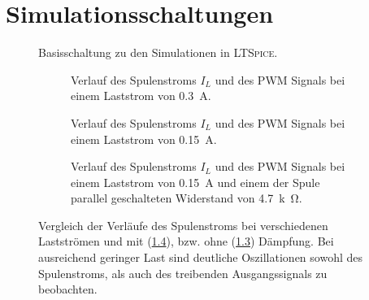\chapter{Simulationsschaltungen}
\begin{figure}[h]
	\centering
	
	\caption[Basisschaltung zu den Simulationen in \textsc{LTSpice}.]{Basisschaltung zu den Simulationen in \textsc{LTSpice}.}
	\label{fig:minimum load simu schaltung}
\end{figure}
\newpage
\begin{figure}[h]
	\centering
	\begin{subfigure}[]{.8\textwidth}
		\centering
		
		\caption{Verlauf des Spulenstroms \(I_L\) und des PWM Signals bei einem Laststrom von \SI{0,3}{A}.}
		\label{subfig:no ringing}
	\end{subfigure}
	\vspace{3mm}
	\begin{subfigure}[]{.8\textwidth}
		\centering
		
		\caption{Verlauf des Spulenstroms \(I_L\) und des PWM Signals bei einem Laststrom von \SI{0,15}{A}.}
		\label{subfig:vanilla ringing}
	\end{subfigure}
	\vspace{3mm}
	\begin{subfigure}{.8\textwidth}
		\centering
		
		\caption{Verlauf des Spulenstroms \(I_L\) und des PWM Signals bei einem Laststrom von \SI{0,15}{A} und einem der Spule parallel geschalteten Widerstand von
		\SI{4,7}{k \ohm}.}
		\label{subfig:dampened}
	\end{subfigure}
	\caption[Vergleich der Verläufe des Spulenstroms bei verschiedenen Lastströmen]{Vergleich der Verläufe des Spulenstroms bei verschiedenen Lastströmen und mit (\cref*{subfig:dampened}), bzw. ohne (\cref*{subfig:vanilla ringing}) Dämpfung.
	Bei ausreichend geringer Last sind deutliche Oszillationen sowohl des Spulenstroms, als auch des treibenden Ausgangssignals zu beobachten.}
	\label{fig:ringing}
\end{figure}